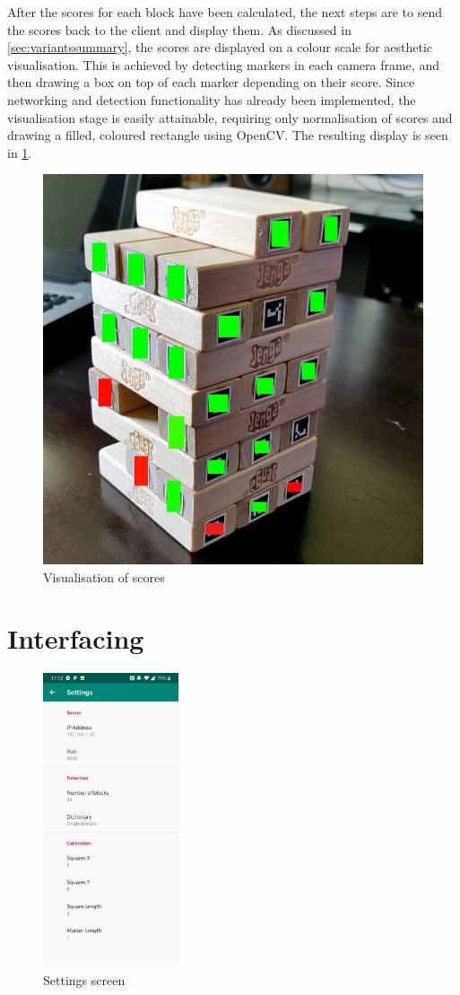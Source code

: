 After the scores for each block have been calculated, the next steps are to send the scores back to the client and display them. As discussed in \cref{sec:variantssummary}, the scores are displayed on a colour scale for aesthetic visualisation. This is achieved by detecting markers in each camera frame, and then drawing a box on top of each marker depending on their score. Since networking and detection functionality has already been implemented, the visualisation stage is easily attainable, requiring only normalisation of scores and drawing a filled, coloured rectangle using OpenCV. The resulting display is seen in \cref{fig:display}.

\vfill
\begin{figure}[ht]
    \centering
    \includegraphics[width=.7\textwidth]{images/implementation/display}
    \caption{Visualisation of scores}
    \label{fig:display}
\end{figure}
\vfill

\newpage\section{Interfacing}

\begin{figure}
\includegraphics[width=4cm]{images/implementation/settings}
\caption{Settings screen}\label{fig:settings}
\end{figure}

